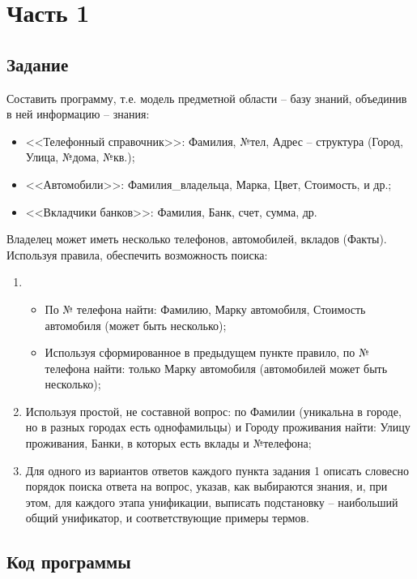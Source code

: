 \documentclass[14pt,a4paper]{scrreprt}
\begin{document}


\thispagestyle{empty}

\chapter{Часть 1}

\section{Задание}

Составить программу, т.е. модель предметной области – базу знаний, объединив в ней
информацию – знания:
\begin{itemize}
	\item <<Телефонный справочник>>: Фамилия, №тел, Адрес -- структура (Город, Улица, №дома, №кв.);
	\item <<Автомобили>>: Фамилия\_владельца, Марка, Цвет, Стоимость, и др.;
	\item <<Вкладчики банков>>: Фамилия, Банк, счет, сумма, др.
\end{itemize}
Владелец может иметь несколько телефонов, автомобилей, вкладов (Факты). Используя правила, обеспечить возможность поиска:
\begin{enumerate}
	\item \begin{itemize}
		\item По № телефона найти: Фамилию, Марку автомобиля, Стоимость автомобиля
		(может быть несколько);
		\item Используя сформированное в предыдущем пункте правило, по № телефона найти: только Марку автомобиля (автомобилей может быть несколько);
	\end{itemize}
	\item Используя простой, не составной вопрос: по Фамилии (уникальна в городе, но в
	разных городах есть однофамильцы) и Городу проживания найти: Улицу проживания, Банки, в которых есть вклады и №телефона;
	\item Для одного из вариантов ответов каждого пункта задания 1 описать словесно порядок поиска ответа на вопрос, указав, как выбираются знания, и, при этом, для каждого этапа унификации, выписать подстановку – наибольший общий унификатор, и соответствующие примеры термов.
\end{enumerate}

\section{Код программы}
\end{document}

